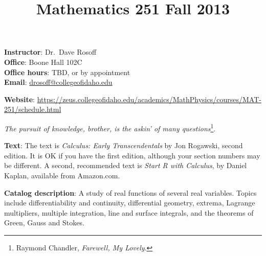 \documentclass[12pt,twoside]{amsart}
\title{{\LARGE Mathematics 251 \hfill Fall 2013}}
\begin{document}
\maketitle
\thispagestyle{empty}
\vspace*{-2ex}
\begin{minipage}[t]{0.45\linewidth}
    \textbf{Instructor}: Dr.\ Dave Rosoff  \\
    \textbf{Office}: Boone Hall 102C \\
    \textbf{Office hours}: TBD, or by appointment \hspace*{0.25in}\\
    \textbf{Email}: \href{mailto:drosoff@collegeofidaho.edu}{drosoff@collegeofidaho.edu} \\
\end{minipage} 
\hspace*{0.09\linewidth}
\begin{minipage}[t]{0.45\linewidth}\begin{flushright}
    \textbf{Website}: \url{https://zeus.collegeofidaho.edu/academics/MathPhysics/courses/MAT-251/schedule.html}
\end{flushright}
\end{minipage}
\vspace*{-2ex}
\begin{center}

{\large \emph{The pursuit of knowledge, brother, is the askin' of many questions}\footnote{Raymond Chandler, \emph{Farewell, My Lovely}.}}.

\end{center}
\textbf{Text}: The text is \emph{Calculus: Early Transcendentals} by Jon Rogawski, second edition. It is OK if you have the first edition, although your section numbers may be different. A second, recommended text is \emph{Start R with Calculus}, by Daniel Kaplan, available from Amazon.com.

\textbf{Catalog description}: A study of real functions of several real variables. Topics include differentiability and continuity, differential geometry, extrema, Lagrange multipliers, multiple integration, line and surface integrals, and the theorems of Green, Gauss and Stokes. 
\end{document}
